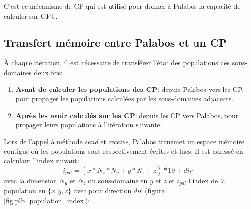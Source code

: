 C'est ce mécanisme de \ac{CP} qui est utilisé pour donner à Palabos la capacité de calculer sur \acs{GPU}.

\subsection{Transfert mémoire entre Palabos et un \acs{CP} }\label{title-transfert_palabos_cp}
À chaque itération, il est nécessaire de transférer l'état des populations des sous-domaines deux fois:
\begin{enumerate}
\item \textbf{Avant de calculer les populations des \ac{CP}}: depuis Palabos vers les \ac{CP}, pour propager les populations calculées par les sous-domaines adjacents.
\item \textbf{Après les avoir calculés sur les \ac{CP}}: depuis les \ac{CP} vers Palabos, pour propager leurs populations à l'itération suivante.
\end{enumerate}

Lors de l'appel à méthode \textit{send} et \textit{receive}, Palabos transmet un espace mémoire contiguë où les populations sont respectivement écrites et lues. Il est adressé en calculant l'index suivant:
\begin{equation}
i_{pal} = ( x*N_z*N_y + y*N_z + z) * 19 + dir
\end{equation}
avec la dimension  $N_y$ et $N_z$ du sous-domaine en $y$ et $z$ et $i_{pal}$ l'index de la population en $\{x,y,z\}$ avec pour direction $dir$ (figure \ref{fig:plb_population_index}):

